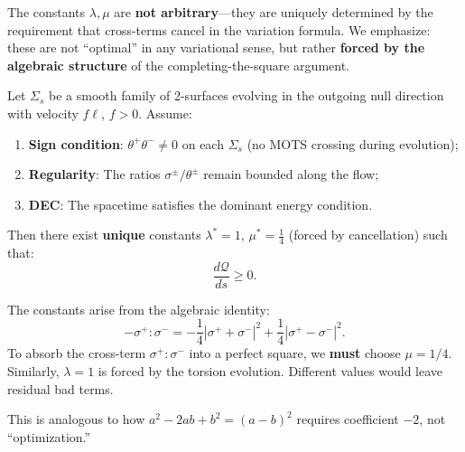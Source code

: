 The constants $\lambda, \mu$ are \textbf{not arbitrary}---they are uniquely determined by the requirement that cross-terms cancel in the variation formula. We emphasize: these are not ``optimal'' in any variational sense, but rather \textbf{forced by the algebraic structure} of the completing-the-square argument.

\begin{theorem}
\label{thm:Q-monotonicity}
Let $\Sigma_s$ be a smooth family of 2-surfaces evolving in the outgoing null direction with velocity $f\ell$, $f > 0$. Assume:
\begin{enumerate}[label=\textbf{(M\arabic*)}]
\item \textbf{Sign condition}: $\theta^+\theta^- \neq 0$ on each $\Sigma_s$ (no MOTS crossing during evolution);
\item \textbf{Regularity}: The ratios $\sigma^\pm/\theta^\pm$ remain bounded along the flow;
\item \textbf{DEC}: The spacetime satisfies the dominant energy condition.
\end{enumerate}
Then there exist \textbf{unique} constants $\lambda^* = 1$, $\mu^* = \frac{1}{4}$ (forced by cancellation) such that:
\begin{equation}
\frac{d\mathcal{Q}}{ds} \geq 0.
\label{eq:Q-monotone}
\end{equation}
\end{theorem}

\begin{remark}
The constants arise from the algebraic identity:
\begin{equation}
-\sigma^+:\sigma^- = -\frac{1}{4}|\sigma^+ + \sigma^-|^2 + \frac{1}{4}|\sigma^+ - \sigma^-|^2.
\end{equation}
To absorb the cross-term $\sigma^+:\sigma^-$ into a perfect square, we \textbf{must} choose $\mu = 1/4$. Similarly, $\lambda = 1$ is forced by the torsion evolution. Different values would leave residual bad terms.

This is analogous to how $a^2 - 2ab + b^2 = (a-b)^2$ requires coefficient $-2$, not ``optimization.''
\end{remark}

